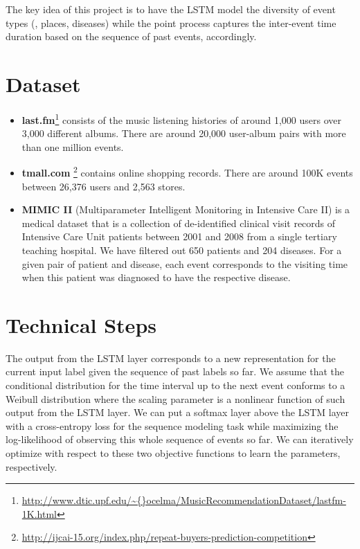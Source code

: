 \documentclass[11pt]{article}
\begin{document}
The key idea of this project is to have the LSTM model the diversity of event types (\eg, places, diseases) while the point process captures the inter-event time duration based on the sequence of past events, accordingly. 

\section{Dataset}
\begin{itemize}
	\item \textbf{last.fm}\footnote{\url{http://www.dtic.upf.edu/\~{}ocelma/MusicRecommendationDataset/lastfm-1K.html}} consists of the music listening histories of around 1,000 users over 3,000 different albums. There are around 20,000 user-album pairs with more than one million events.
	\item \textbf{tmall.com} \footnote{\url{http://ijcai-15.org/index.php/repeat-buyers-prediction-competition}} contains online shopping records. There are around 100K events between 26,376 users and 2,563 stores.
	\item \textbf{MIMIC II} (Multiparameter Intelligent Monitoring in Intensive Care II) is a medical dataset that is a collection of de-identified clinical visit records of Intensive Care Unit patients between 2001 and 2008 from a single tertiary teaching hospital. We have filtered out 650 patients and 204 diseases. For a given pair of patient and disease, each event corresponds to the visiting time when this patient was diagnosed to have the respective disease.
\end{itemize}

\section{Technical Steps}

The output from the LSTM layer corresponds to a new representation for the current input label given the sequence of past labels so far. We assume that the conditional distribution for the time interval up to the next event conforms to a Weibull distribution where the scaling parameter is a nonlinear function of such output from the LSTM layer. We can put a softmax layer above the LSTM layer with a cross-entropy loss for the sequence modeling task while maximizing the log-likelihood of observing this whole sequence of events so far. We can iteratively optimize with respect to these two objective functions to learn the parameters, respectively. 






\end{document}
